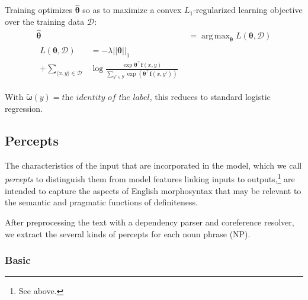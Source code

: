 \documentclass[11pt,letterpaper]{article}
\DeclareMathOperator*{\argmax}{arg\,max}
\newcommand{\ensuretext}[1]{#1}
\newcommand{\nssmarker}{\ensuretext{\textcolor{magenta}{\ensuremath{^{\textsc{NS}}_{\textsc{S}}}}}}
\newcommand{\arkcomment}[3]{\ensuretext{\textcolor{#3}{[#1 #2]}}}
\newcommand{\nss}[1]{\arkcomment{\nssmarker}{#1}{magenta}}
\newcommand{\costversion}[1]{}
\begin{document}
Training optimizes $\hat{\boldsymbol{\theta}}$ so as to maximize a convex $L_1$-regularized
\costversion{\emph{softmax-margin} }learning objective\costversion{ \citep{gimpel}} over the training data $\mathcal{D}$:
\begin{align}
\hat{\boldsymbol{\theta}} &= \argmax_{\boldsymbol{\theta}} L(\boldsymbol{\theta}, \mathcal{D}) \\
\begin{split}
L(\boldsymbol{\theta}, \mathcal{D}) &= -\lambda ||\boldsymbol{\theta}||_1 \\ 
+ \sum_{\langle x,y \rangle\in\mathcal{D}} &\log{\frac{\exp{\boldsymbol{\theta}^{\top}\mathbf{f}(x,y)}}{\sum_{y' \in \mathcal{Y}}\exp{\left(\boldsymbol{\theta}^{\top}\mathbf{f}(x,y')\costversion{ + \kappa\textit{cost}(y,y')}\right)}}}
\end{split}
\end{align}
\costversion{The \emph{cost function} allows us to penalize some errors more than others during training, 
taking into account the linguistic functions of the labels.
It is zero for the gold label and nonnegative for the others.\nss{intuition}

This framework gives us several ways to design a classifier appropriate to the task: 
the attributes, the space of labels $\mathcal{Y}$ to consider, 
and the cost function, and of course, the features themselves.}
With \costversion{$\kappa = 0$, $\mathcal{Y} = \{\textit{gold labels in training}\}$, 
and }$\tilde{\boldsymbol{\omega}}(y) = \textit{the identity of the label}$, 
this reduces to standard logistic regression.

\subsection{Percepts}\label{sec:feats}

The characteristics of the input that are incorporated in the model, which we call \emph{percepts} 
to distinguish them from model features linking inputs to outputs,\footnote{See above.} 
are intended to capture the aspects of English morphosyntax that may be relevant 
to the semantic and pragmatic functions of definiteness.

After preprocessing the text with a dependency parser and coreference resolver, 
we extract the several kinds of percepts for each noun phrase (NP).

\subsubsection{Basic}
\end{document}
